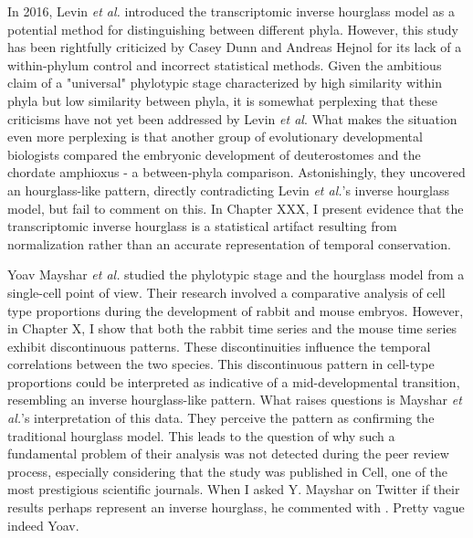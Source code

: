 In 2016, Levin \textit{et al.} introduced the transcriptomic inverse hourglass model as a potential method for distinguishing between different phyla\cite{Levin2016}. However, this study has been rightfully criticized by Casey Dunn and Andreas Hejnol for its lack of a within-phylum control\cite{hejnol2016} and incorrect statistical methods\cite{Dunn2018}. Given the ambitious claim of a "universal" phylotypic stage characterized by high similarity within phyla but low similarity between phyla, it is somewhat perplexing that these criticisms have not yet been addressed by Levin \textit{et al}. What makes the situation even more perplexing is that another group of evolutionary developmental biologists compared the embryonic development of deuterostomes and the chordate amphioxus - a between-phyla comparison. Astonishingly, they uncovered an hourglass-like pattern\cite{PerezPosada2022}, directly contradicting Levin \textit{et al.}'s inverse hourglass model, but fail to comment on this. In Chapter XXX, I present evidence that the transcriptomic inverse hourglass is a statistical artifact resulting from normalization rather than an accurate representation of temporal conservation. 

Yoav Mayshar \textit{et al.} studied the phylotypic stage and the hourglass model from a single-cell point of view\cite{Mayshar2023}. Their research involved a comparative analysis of cell type proportions during the development of rabbit and mouse embryos. However, in Chapter X, I show that both the rabbit time series and the mouse time series exhibit discontinuous patterns. These discontinuities influence the temporal correlations between the two species. This discontinuous pattern in cell-type proportions could be interpreted as indicative of a mid-developmental transition, resembling an inverse hourglass-like pattern. What raises questions is Mayshar \textit{et al.}'s interpretation of this data. They perceive the pattern as confirming the traditional hourglass model. This leads to the question of why such a fundamental problem of their analysis was not detected during the peer review process, especially considering that the study was published in Cell, one of the most prestigious scientific journals. When I asked Y. Mayshar on Twitter if their results perhaps represent an inverse hourglass, he commented with . Pretty vague indeed Yoav.

